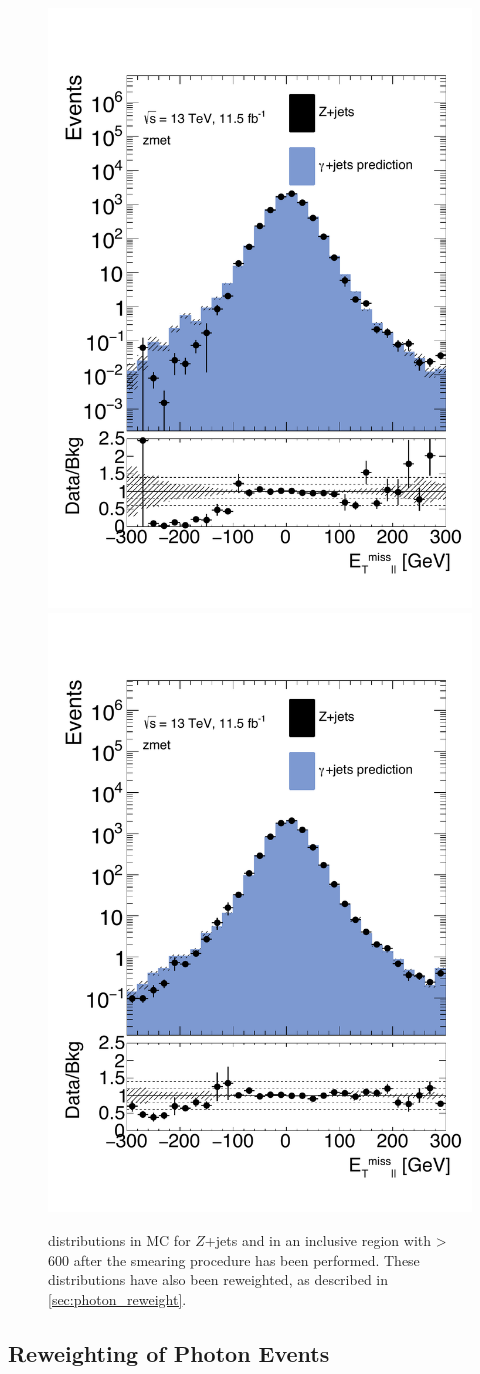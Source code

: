 \begin{centering}
\begin{figure}[!hbt]
\myfloatalign
\includegraphics[width=.45\linewidth]{figures/photons/MC_hist_METl_Pt_0_ee_2j_2016_mcmetl_ptsmrw_smear_zmet_.pdf}
\includegraphics[width=.45\linewidth]{figures/photons/MC_hist_METl_Pt_0_mm_2j_2016_mcmetl_ptsmrw_smear_zmet_.pdf}
\caption{\metl distributions in \ac{MC} for $Z$+jets and \gjets in an inclusive region with \HT > 600 \gev after the smearing procedure has been performed. These distributions have also been \pt reweighted, as described in \autoref{sec:photon_reweight}.}
\label{fig:photon_metparallelsmeared}
\end{figure}
\end{centering}

\subsection{\pt Reweighting of Photon Events}
\label{sec:photon_reweight}


